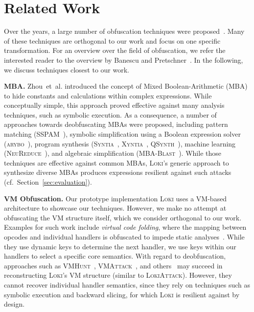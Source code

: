 \documentclass[letterpaper,twocolumn,10pt]{article}
\newcommand{\etal}{et~al.\xspace}
\newcommand{\cf}{cf.\xspace}
\theoremstyle{customexample}
\theoremstyle{customexperiment}
\newcommand{\loki}{\textsc{Loki}\xspace}
\newcommand{\lokiattack}{\textsc{LokiAttack}\xspace}
\newcommand{\vmhunt}{\textsc{VMHunt}\xspace}
\newcommand{\vmattack}{\textsc{VMAttack}\xspace}
\newcommand{\neureduce}{\textsc{NeuReduce}\xspace}
\newcommand{\sspam}{\textsc{SSPAM}\xspace}
\newcommand{\arybo}{\textsc{arybo}\xspace}
\newcommand{\qsynth}{\textsc{QSynth}\xspace}
\newcommand{\mbablast}{\textsc{MBA-Blast}\xspace}
\newcommand{\xyntia}{\textsc{Xyntia}\xspace}
\newcommand{\syntia}{\textsc{Syntia}\xspace}
\begin{document}
 \section{Related Work}
Over the years, a large number of obfuscation techniques were proposed~\cite{collberg1997taxonomy,zhou2007information,obf-general,obf-probfuscation,obf-vmbased,obf-controlflow,obf-selfmodify,banescu2016code,wang2011linear,ollvm,ollivier2019howto,nakanishi2020intertwining,borrello2021hiding}. Many of these techniques are orthogonal to our work and focus on one specific transformation. For an overview over the field of obfuscation, we refer the interested reader to the overview by Banescu and Pretschner~\cite{banescu2018tutorial}. 
In the following, we discuss techniques closest to our work.

\textbf{MBA.}
Zhou~\etal introduced the concept of Mixed Boolean-Arithmetic (MBA) to hide constants and calculations within complex expressions. While conceptually simple, this approach proved effective against many analysis techniques, such as symbolic execution. As a consequence, a number of approaches towards deobfuscating MBAs were proposed, including
pattern matching (\sspam~\cite{eyrolles2016defeating}), 
symbolic simplification using a Boolean expression solver (\arybo~\cite{guinet2016arybo}),
program synthesis (\syntia~\cite{blazytko2017syntia}, \xyntia~\cite{menguy2021xyntia}, \qsynth~\cite{david2020qsynth}),
machine learning (\neureduce~\cite{feng2020neureduce}), and
algebraic simplification (\mbablast~\cite{liu2021mbablast}).
While those techniques are effective against common MBAs, \loki's generic approach to synthesize diverse MBAs produces expressions resilient against such attacks (\cf~Section~\ref{sec:evaluation}).

 
\textbf{VM Obfuscation.}
Our prototype implementation \loki uses a VM-based architecture to showcase our techniques. However, we make no attempt at obfuscating the VM structure itself, which we consider orthogonal to our work. 
Examples for such work include \emph{virtual code folding}, where the mapping between opcodes and individual handlers is obfuscated to impede static analyses~\cite{suk2020vcf,lee2018vodka,xue2018exploiting,cheng2019dynopvm}. While they use dynamic keys to determine the next handler, we use keys within our handlers to select a specific core semantics. 
With regard to deobfuscation, approaches such as \vmhunt~\cite{xu2018vmhunt}, \vmattack~\cite{kalysch2017vmattack}, and others~\cite{kinder2012towards,sharif2009automatic} may succeed in reconstructing \loki's VM structure (similar to \lokiattack). However, they cannot recover individual handler semantics, since they rely on techniques such as symbolic execution and backward slicing, for which \loki is resilient against by design.
\end{document}
